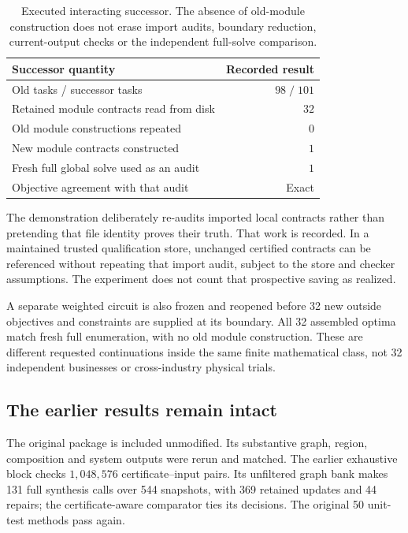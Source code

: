 \documentclass[11pt,letterpaper]{article}
\theoremstyle{definition}\newtheorem{definition}[theorem]{Definition}
\theoremstyle{remark}\newtheorem{remark}[theorem]{Remark}
\begin{document}
\begin{table}[htbp]\centering\small
\caption{Executed interacting successor. The absence of old-module construction does not erase import audits, boundary reduction, current-output checks or the independent full-solve comparison.}
\begin{tabularx}{\linewidth}{@{}Yr@{}}\toprule
Successor quantity & Recorded result\\\midrule
Old tasks / successor tasks & $98\;/\;101$\\
Retained module contracts read from disk & $32$\\
Old module constructions repeated & $0$\\
New module contracts constructed & $1$\\
Fresh full global solve used as an audit & $1$\\
Objective agreement with that audit & Exact\\\bottomrule
\end{tabularx}
\label{tab:successor}
\end{table}

The demonstration deliberately re-audits imported local contracts rather than pretending that file identity proves their truth. That work is recorded. In a maintained trusted qualification store, unchanged certified contracts can be referenced without repeating that import audit, subject to the store and checker assumptions. The experiment does not count that prospective saving as realized.

A separate weighted circuit is also frozen and reopened before 32 new outside objectives and constraints are supplied at its boundary. All 32 assembled optima match fresh full enumeration, with no old module construction. These are different requested continuations inside the same finite mathematical class, not 32 independent businesses or cross-industry physical trials.

\subsection{The earlier results remain intact}
The original package is included unmodified. Its substantive graph, region, composition and system outputs were rerun and matched. The earlier exhaustive block checks $1{,}048{,}576$ certificate--input pairs. Its unfiltered graph bank makes 131 full synthesis calls over 544 snapshots, with 369 retained updates and 44 repairs; the certificate-aware comparator ties its decisions. The original 50 unit-test methods pass again.
\end{document}
